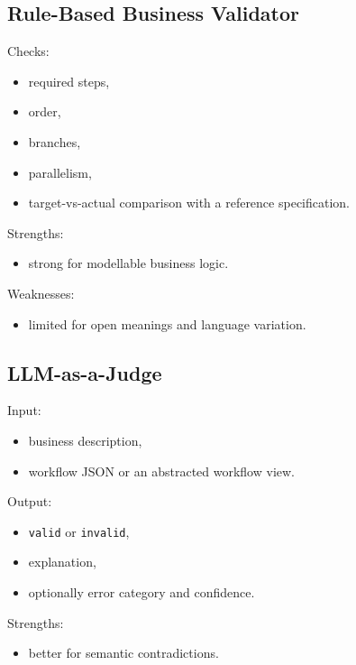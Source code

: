 \documentclass[12pt,a4paper]{article}
\begin{document}
\subsection{Rule-Based Business Validator}

Checks:

\begin{itemize}
  \item required steps,
  \item order,
  \item branches,
  \item parallelism,
  \item target-vs-actual comparison with a reference specification.
\end{itemize}

Strengths:

\begin{itemize}
  \item strong for modellable business logic.
\end{itemize}

Weaknesses:

\begin{itemize}
  \item limited for open meanings and language variation.
\end{itemize}

\subsection{LLM-as-a-Judge}

Input:

\begin{itemize}
  \item business description,
  \item workflow JSON or an abstracted workflow view.
\end{itemize}

Output:

\begin{itemize}
  \item \texttt{valid} or \texttt{invalid},
  \item explanation,
  \item optionally error category and confidence.
\end{itemize}

Strengths:

\begin{itemize}
  \item better for semantic contradictions.
\end{itemize}
\end{document}
